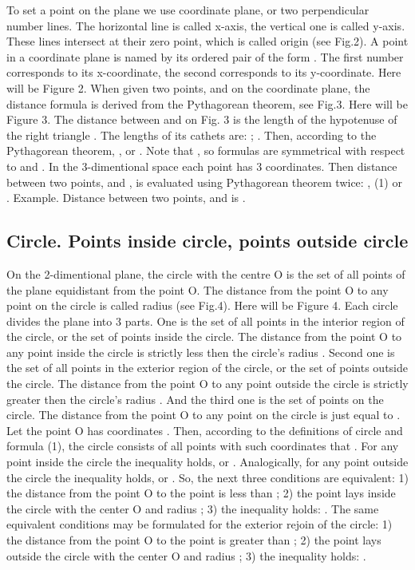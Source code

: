 \documentclass{article}
\begin{document}
To set a point on the plane we use coordinate plane, or two perpendicular number lines.
The horizontal line is called x-axis, the vertical one is called y-axis.
These lines intersect at their zero point, which is called origin (see Fig.2).
A point in a coordinate plane is named by its ordered pair of the form     .
The first number corresponds to its x-coordinate, the second corresponds to its y-coordinate.
Here will be Figure 2.
When given two points,      and      on the coordinate plane, the distance formula is derived from the Pythagorean theorem, see Fig.3.
Here will be Figure 3.
The distance      between      and      on Fig. 3 is the length of the hypotenuse of the right triangle    .
The lengths of its cathets are:     ;     . Then, according to the Pythagorean theorem,
    ,
or
    .
Note that     , so formulas are symmetrical with respect to      and     .
In the 3-dimentional space each point has 3 coordinates.
Then distance between two points,      and     , is evaluated using Pythagorean theorem twice:
    ,                                     (1)
or
    .
Example.
Distance between two points,      and      is
    .

\subsection{Circle. Points inside circle, points outside circle} %

On the 2-dimentional plane, the circle with the centre O is the set of all points of the plane equidistant from the point O.
The distance      from the point O to any point on the circle is called radius (see Fig.4).
Here will be Figure 4.
Each circle divides the plane into 3 parts.
One is the set of all points in the interior region of the circle, or the set of points inside the circle.
The distance from the point O to any point      inside the circle is strictly less then the circle’s radius     .
Second one is the set of all points in the exterior region of the circle, or the set of points outside the circle.
The distance from the point O to any point      outside the circle is strictly greater then the circle’s radius     .
And the third one is the set of points on the circle.
The distance from the point O to any point      on the circle is just equal to     .
Let the point O has coordinates     .
Then, according to the definitions of circle and formula (1), the circle consists of all points with such coordinates      that
    .
For any point      inside the circle the inequality      holds, or
    .
Analogically, for any point      outside the circle the inequality      holds, or
    .
So, the next three conditions are equivalent:
1) the distance      from the point O to the point      is less than     ;
2) the point      lays inside the circle with the center O and radius     ;
3) the inequality holds:
    .
The same equivalent conditions may be formulated for the exterior rejoin of the circle:
1) the distance      from the point O to the point      is greater than     ;
2) the point      lays outside the circle with the center O and radius     ;
3) the inequality holds:
    .
\end{document}

